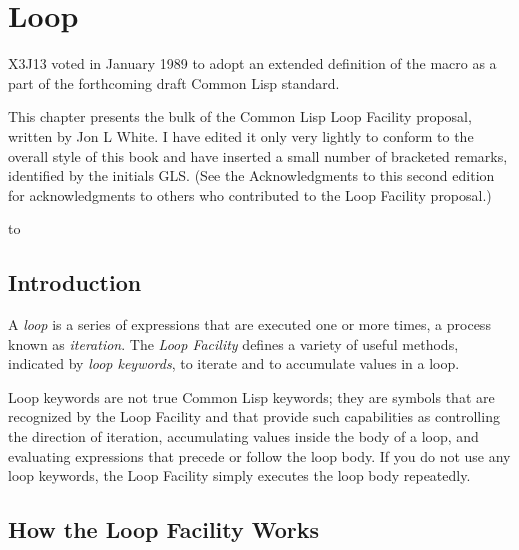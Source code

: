 
\clearpage\def\pagestatus{FINAL PROOF}


\chapter{Loop}
\label{LOOP}

\begin{new}
\prefaceword
X3J13 voted in January 1989
to adopt an extended definition of the  macro
as a part of the forthcoming draft Common Lisp standard.

This chapter presents the bulk of the Common Lisp
Loop Facility proposal, written by Jon L White.  I have
edited it only very lightly
to conform to the overall style of this book and have inserted a small
number of bracketed remarks, identified by the initials GLS.
(See the Acknowledgments to this second edition for
acknowledgments to others who contributed to the Loop Facility proposal.)

\noindent\hbox to \textwidth{\hss---Guy L. Steele Jr.}

\section{Introduction}

A {\it loop\/} is a series of expressions that are executed one or more times,
a process known as {\it iteration}.
The {\it Loop Facility\/} defines a
variety of useful methods, indicated by
{\it loop keywords}, to iterate and to
accumulate values in a loop.


Loop keywords are not true Common Lisp keywords; they are symbols that
are recognized by the Loop Facility and that provide such capabilities
as controlling the direction of iteration, accumulating values inside
the body of a loop, and evaluating expressions that precede or follow
the loop body.  If you do not use any loop keywords, the Loop Facility
simply executes the loop body repeatedly.


\section{How the Loop Facility Works}


\end{new}
